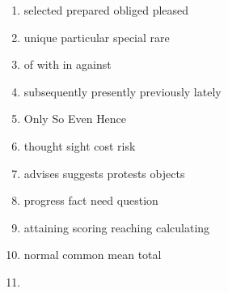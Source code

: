 \begin{enumerate}
	\item


\fourchoices
{selected}
{prepared}
{obliged}
{pleased}




\item


\fourchoices
{unique}
{particular}
{special}
{rare}




\item


\fourchoices
{of}
{with}
{in}
{against}




\item

\fourchoices
{subsequently}
{presently}
{previously}
{lately}




\item


\fourchoices
{Only}
{So}
{Even}
{Hence}




\item


\fourchoices
{thought}
{sight}
{cost}
{risk}




\item


\fourchoices
{advises}
{suggests}
{protests}
{objects}




\item


\fourchoices
{progress}
{fact}
{need}
{question}




\item


\fourchoices
{attaining}
{scoring}
{reaching}
{calculating}




\item


\fourchoices
{normal}
{common}
{mean}
{total}




\item


\end{enumerate}
